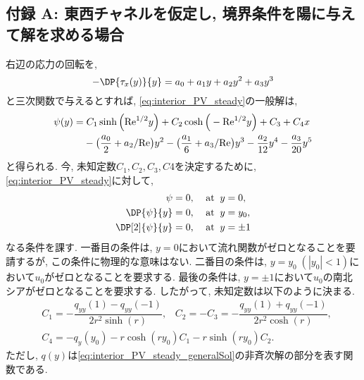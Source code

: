 \subsection*{付録 A: 東西チャネルを仮定し, 境界条件を陽に与えて解を求める場合}
\renewcommand{\theequation}{A.\arabic{equation}}
\setcounter{equation}{0}
右辺の応力の回転を, 
\begin{equation}
   - \DP{\tau_x(y)}{y} = a_0 + a_1 y + a_2 y^2 + a_3 y^3
\end{equation}
と三次関数で与えるとすれば, 
\eqref{eq:interior_PV_steady}の一般解は, 
\begin{equation}
\begin{split}
    \psi(y) =& \; C_1 \sinh \Big( {\rm Re}^{1/2} y \Big) + C_2 \cosh \Big( -{\rm Re}^{1/2} y \Big) 
               + C_3 + C_4 x \\
             & - \big(\dfrac{a_0}{2} + a_2/{\rm Re}\big)y^2 - \big( \dfrac{a_1}{6} + a_3/{\rm Re} \big) y^3
               - \dfrac{a_2}{12}y^4 - \dfrac{a_3}{20} y^5
\end{split}
\label{eq:interior_PV_steady_generalSol}
\end{equation}
と得られる. 
今, 未知定数$C_1, C_2, C_3, C4$を決定するために, 
\eqref{eq:interior_PV_steady}に対して, 
\begin{equation}
\begin{split}
   \psi &= 0, \;\;\;\; {\rm at} \;\; y = 0, \\
   \DP{\psi}{y} &= 0, \;\;\;\; {\rm at} \;\; y = y_0,  \\
   \DP[2]{\psi}{y} &= 0, \;\;\;\; {\rm at} \;\; y = \pm 1
\end{split}
\label{eq:BC_interior_streamFunc_nodim}
\end{equation}
なる条件を課す.  
一番目の条件は, $y=0$において流れ関数がゼロとなることを要請するが,  
この条件に物理的な意味はない. 
二番目の条件は, $y=y_0\;(|y_0| < 1)$において$u_0$がゼロとなることを要求する. 
最後の条件は, $y=\pm 1$において$u_0$の南北シアがゼロとなることを要求する. 
したがって, 未知定数は以下のように決まる. 
\begin{equation}
\begin{split}
  &C_1 = - \dfrac{q_{yy}(1) - q_{yy}(-1)}{2r^2 \sinh(r)}, \;\;\;
   C_2 = - C_3 = - \dfrac{q_{yy}(1) + q_{yy}(-1)}{2r^2 \cosh(r)}, \\
  &C_4 = - q_y(y_0) - r\cosh(ry_0)C_1 - r\sinh(ry_0)C_2. 
\end{split}
\end{equation}
ただし, $q(y)$は\eqref{eq:interior_PV_steady_generalSol}の非斉次解の部分を表す関数である. 

